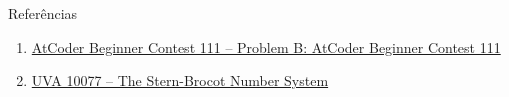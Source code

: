\begin{frame}[fragile]{Referências}

    \begin{enumerate}
        \item \href{https://atcoder.jp/contests/abc111/tasks/abc111_b}{AtCoder Beginner
            Contest 111 -- Problem B: AtCoder Beginner Contest 111}

        \item \href{https://uva.onlinejudge.org/index.php?option=com_onlinejudge&Itemid=8&category=24&page=show_problem&problem=1018}{UVA 10077 -- The Stern-Brocot Number System}
    \end{enumerate}

\end{frame}
